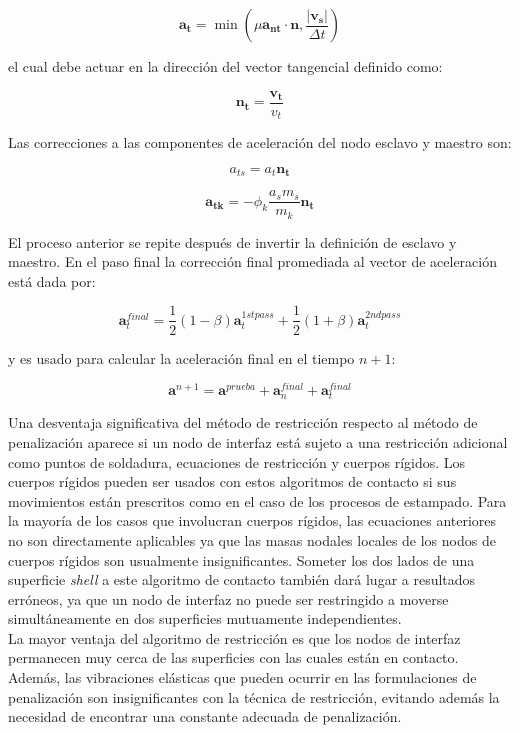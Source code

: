 $$
\mathbf{a_t} = \min\left( \mu \mathbf{a_{nt}} \cdot \mathbf{n} , \frac{|\mathbf{v_s}|}{\Delta t} \right)
$$

el cual debe actuar en la dirección del vector tangencial definido como:

$$
\mathbf{n_t} = \frac{\mathbf{v_t}}{v_t}
$$

Las correcciones a las componentes de aceleración del nodo esclavo y maestro son: 

$$
a_{ts} = a_{t} \mathbf{n_t}
$$

$$
\mathbf{a_{tk}} = - \phi_k \frac{a_s m_s}{m_k} \mathbf{n_t}
$$

El proceso anterior se repite después de invertir la definición de esclavo y maestro. En el 
paso final la corrección final promediada al vector de aceleración está dada por:

$$
\mathbf{a}_t^{final} = \frac{1}{2} \left( 1-\beta \right) \mathbf{a}_t^{1st pass}  + 
\frac{1}{2} \left( 1 + \beta \right) \mathbf{a}_t^{2nd pass} 
$$

y es usado para calcular la aceleración final en el tiempo $n+1$: 

$$
\mathbf{a}^{n+1} = \mathbf{a}^{prueba}  +  \mathbf{a}_n^{final} + \mathbf{a}_t^{final}
$$

Una desventaja significativa del método de restricción respecto al método de penalización 
aparece si un nodo de interfaz está sujeto a una restricción adicional como puntos de 
soldadura, ecuaciones de restricción y cuerpos rígidos. Los cuerpos rígidos pueden 
ser usados con estos algoritmos de contacto si sus movimientos están prescritos como 
en el caso de los procesos de estampado. Para la mayoría de los casos que involucran 
cuerpos rígidos, las ecuaciones anteriores no son directamente aplicables ya que las 
masas nodales locales de los nodos de cuerpos rígidos son usualmente insignificantes. 
Someter los dos lados de una superficie \textit{shell} a este algoritmo de contacto 
también dará lugar a resultados erróneos, ya que un nodo de interfaz no puede 
ser restringido a moverse simultáneamente en dos superficies mutuamente independientes.\\

La mayor ventaja del algoritmo de restricción es que los nodos de interfaz permanecen 
muy cerca de las superficies con las cuales están en contacto. Además, las vibraciones 
elásticas que pueden ocurrir en las formulaciones de penalización son insignificantes 
con la técnica de restricción, evitando además la necesidad de encontrar una constante 
adecuada de penalización.




